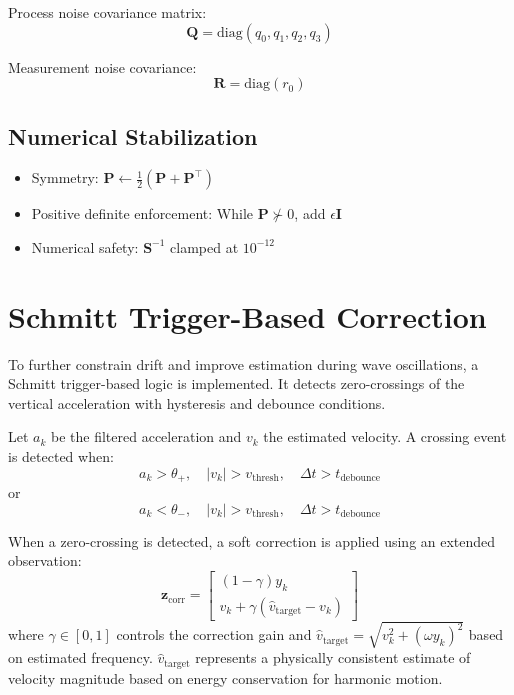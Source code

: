 \documentclass[11pt,letterpaper]{article}
\begin{document}
Process noise covariance matrix:
\begin{equation}
\bm{Q} = \mathrm{diag}(q_0, q_1, q_2, q_3)
\end{equation}

Measurement noise covariance:
\begin{equation}
\bm{R} = \mathrm{diag}(r_0)
\end{equation}

\subsection*{Numerical Stabilization}
\begin{itemize}
\item Symmetry: $\bm{P} \leftarrow \frac{1}{2}(\bm{P}+\bm{P}^\top)$
\item Positive definite enforcement: While $\bm{P} \not\succ 0$, add $\epsilon\bm{I}$
\item Numerical safety: $\bm{S}^{-1}$ clamped at $10^{-12}$
\end{itemize}


\section{Schmitt Trigger-Based Correction}
To further constrain drift and improve estimation during wave oscillations, a Schmitt trigger-based logic is implemented. It detects zero-crossings of the vertical acceleration with hysteresis and debounce conditions.

Let \( a_k \) be the filtered acceleration and \( v_k \) the estimated velocity. A crossing event is detected when:
\[
a_k > \theta_{+}, \quad |v_k| > v_\text{thresh}, \quad \Delta t > t_\text{debounce}
\]
or
\[
a_k < \theta_{-}, \quad |v_k| > v_\text{thresh}, \quad \Delta t > t_\text{debounce}
\]

When a zero-crossing is detected, a soft correction is applied using an extended observation:
\begin{equation}
\mathbf{z}_\text{corr} =
\begin{bmatrix}
(1 - \gamma)y_k \\
v_k + \gamma(\hat{v}_\text{target} - v_k)
\end{bmatrix}
\end{equation}
where \( \gamma \in [0,1] \) controls the correction gain and \( \hat{v}_\text{target} = \sqrt{v_k^2 + (\omega y_k)^2} \) based on estimated frequency.
$\hat{v}_\text{target}$ represents a physically consistent estimate of velocity magnitude based on energy conservation for harmonic motion.
\end{document}
